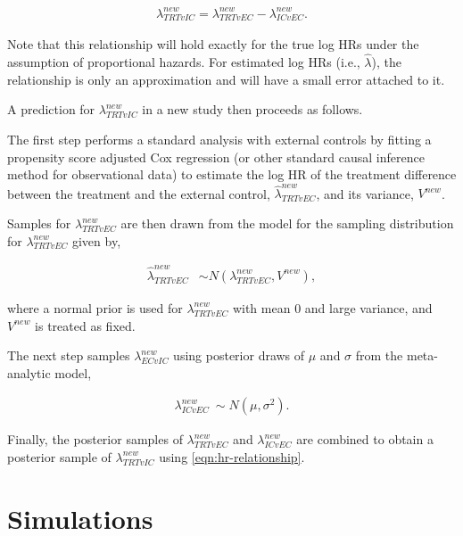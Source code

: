 \documentclass[11pt,final,fleqn]{article}\usepackage[]{graphicx}\usepackage[]{color}
\begin{document}
\begin{align} \label{eqn:hr-relationship}
\lambda_{\textit{TRT}vIC}^{new} = \lambda_{\textit{TRT}vEC}^{new} - \lambda_{ICvEC}^{new}.
\end{align}

Note that this relationship will hold exactly for the true log HRs under the assumption of proportional hazards. For estimated log HRs (i.e., $\hat{\lambda}$), the relationship is only an approximation and will have a small error attached to it. 

A prediction for $\lambda_{\textit{TRT}vIC}^{new} $ in a new study then proceeds as follows. 

The first step performs a standard analysis with external controls by fitting a propensity score adjusted Cox regression (or other standard causal inference method for observational data) to estimate the log HR of the treatment difference between the treatment and the external control, $\hat{\lambda}_{\textit{TRT}vEC}^{new}$, and its variance, $V^{new}$.  

Samples for $\lambda_{\textit{TRT}vEC}^{new}$ are then drawn from the model for the sampling distribution for $\lambda_{\textit{TRT}vEC}^{new}$ given by,

\begin{align}
\hat{\lambda}_{\textit{TRT}vEC}^{new} &\sim N(\lambda_{\textit{TRT}vEC}^{new}, V^{new}),
\end{align}

where a normal prior is used for $\lambda_{\textit{TRT}vEC}^{new}$ with mean $0$ and large variance, and $V^{new}$ is treated as fixed. 

The next step samples $\lambda_{ECvIC}^{new}$ using posterior draws of $\mu$ and $\sigma$ from the meta-analytic model,

\begin{align}
\lambda_{ICvEC}^{new} ~ \sim N ( \mu , \sigma^2).
\end{align}

Finally, the posterior samples of $\lambda_{\textit{TRT}vEC}^{new}$ and $\lambda_{ICvEC}^{new}$ are combined to obtain a posterior sample of $\lambda_{\textit{TRT}vIC}^{new}$ using \autoref{eqn:hr-relationship}.


\section{Simulations} \label{sec:simulations}
\end{document}
